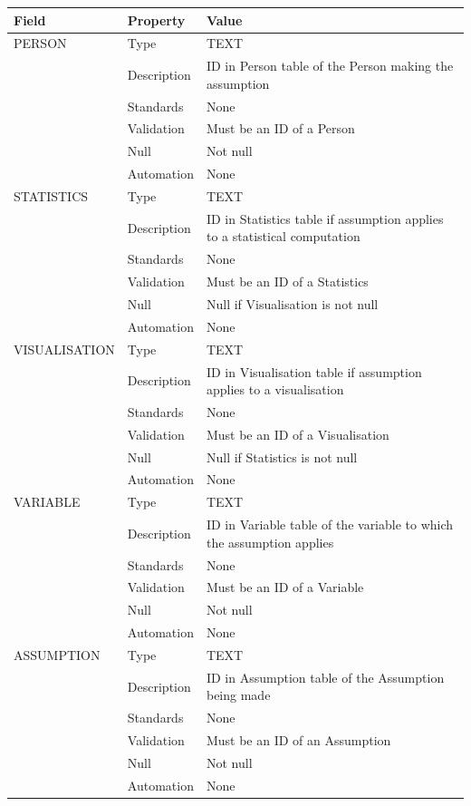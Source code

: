 \begin{longtable}[]{@{}
  >{\raggedright\arraybackslash}p{}
  >{\raggedright\arraybackslash}p{}
  >{\raggedright\arraybackslash}p{}@{}}
\toprule\noalign{}
\begin{minipage}[b]{\linewidth}\raggedright
Field
\end{minipage} & \begin{minipage}[b]{\linewidth}\raggedright
Property
\end{minipage} & \begin{minipage}[b]{\linewidth}\raggedright
Value
\end{minipage} \\
\midrule\noalign{}
\endhead
\bottomrule\noalign{}
\endlastfoot
PERSON & Type & TEXT \\
& Description & ID in Person table of the Person making the
assumption \\
& Standards & None \\
& Validation & Must be an ID of a Person \\
& Null & Not null \\
& Automation & None \\
STATISTICS & Type & TEXT \\
& Description & ID in Statistics table if assumption applies to a
statistical computation \\
& Standards & None \\
& Validation & Must be an ID of a Statistics \\
& Null & Null if Visualisation is not null \\
& Automation & None \\
VISUALISATION & Type & TEXT \\
& Description & ID in Visualisation table if assumption applies to a
visualisation \\
& Standards & None \\
& Validation & Must be an ID of a Visualisation \\
& Null & Null if Statistics is not null \\
& Automation & None \\
VARIABLE & Type & TEXT \\
& Description & ID in Variable table of the variable to which the
assumption applies \\
& Standards & None \\
& Validation & Must be an ID of a Variable \\
& Null & Not null \\
& Automation & None \\
ASSUMPTION & Type & TEXT \\
& Description & ID in Assumption table of the Assumption being made \\
& Standards & None \\
& Validation & Must be an ID of an Assumption \\
& Null & Not null \\
& Automation & None \\
\end{longtable}

